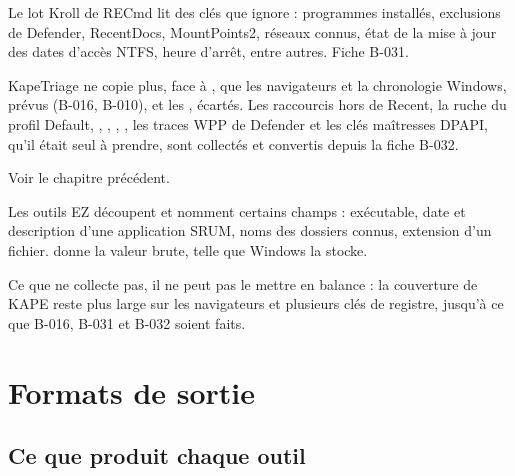 \documentclass[11pt,a4paper,oneside]{report}
\begin{document}
\begin{description}[style=nextline,leftmargin=1em]
  \item[Couverture du registre] Le lot Kroll de RECmd lit des clés que \wac{}
        ignore : programmes installés, exclusions de Defender, RecentDocs,
        MountPoints2, réseaux connus, état de la mise à jour des dates d'accès
        NTFS, heure d'arrêt, entre autres. Fiche B-031.
  \item[Couverture de fichiers] KapeTriage ne copie plus, face à \wac{}, que
        les navigateurs et la chronologie Windows, prévus (B-016, B-010), et les
        , écartés. Les raccourcis hors de Recent, la ruche
        du profil Default, , ,
        , , les traces WPP de
        Defender et les clés maîtresses DPAPI, qu'il était seul à prendre, sont
        collectés et convertis depuis la fiche B-032.
  \item[Vitesse sur les petits artefacts et en collecte] Voir le chapitre
        précédent.
  \item[Interprétations prêtes à lire] Les outils EZ découpent et nomment certains
        champs : exécutable, date et description d'une application SRUM, noms des
        dossiers connus, extension d'un fichier. \wac{} donne la valeur brute,
        telle que Windows la stocke.
\end{description}

\begin{attention}
Ce que \wac{} ne collecte pas, il ne peut pas le mettre en balance : la
couverture de KAPE reste plus large sur les navigateurs et plusieurs clés de
registre, jusqu'à ce que B-016, B-031 et B-032 soient faits.
\end{attention}

\chapter{Formats de sortie}

\section{Ce que produit chaque outil}
\end{document}
